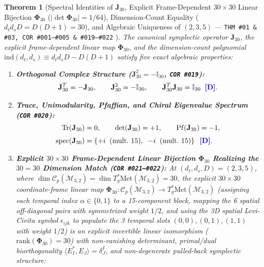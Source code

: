 \documentclass[11pt,a4paper]{article}
\newcommand{\catD}{\text{\textbf{\textcolor{blue!75!black}{[D]}}}}
\theoremstyle{definition}
\theoremstyle{plain}
\newtheorem{theorem}[axiom]{Theorem}
\theoremstyle{remark}
\begin{document}
\begin{theorem}[Spectral Identities of $\mathbf{J}_{30}$, Explicit Frame-Dependent $30\times 30$ Linear Bijection $\bm{\Phi}_{30}$ ($|\det\bm{\Phi}_{30}| = 1/64$), Dimension-Count Equality ($d_t d_s D = D(D+1) = 30$), and Algebraic Uniqueness of $(2,3,5)$ --- \texttt{THM~\#01 \& \#03, COR~\#001--\#005 \& \#019--\#022} \catD]\label{thm:c1_j30_diophantine}\label{thm:c1_symplectic_uniqueness}
The canonical symplectic operator $\mathbf{J}_{30}$, the explicit frame-dependent linear map $\bm{\Phi}_{30}$, and the dimension-count polynomial $\mathrm{ind}(d_t, d_s) \equiv d_t d_s D - D(D+1)$ satisfy five exact algebraic properties:
\begin{enumerate}[label=(\roman*)]
  \item \textbf{Orthogonal Complex Structure ($\mathbf{J}_{30}^2 = -\mathbb{I}_{30}$, \texttt{COR~\#019}):}
  \begin{equation}\label{eq:c1_j30_complex}
  \mathbf{J}_{30}^T = -\mathbf{J}_{30}, \qquad
  \mathbf{J}_{30}^2 = -\mathbb{I}_{30}, \qquad
  \mathbf{J}_{30}^T\mathbf{J}_{30} = \mathbb{I}_{30} \;\;\catD.
  \end{equation}
  \item \textbf{Trace, Unimodularity, Pfaffian, and Chiral Eigenvalue Spectrum (\texttt{COR~\#020}):}
  \begin{align}
  \mathrm{Tr}\!\left(\mathbf{J}_{30}\right) &= 0, \qquad
  \det\!\left(\mathbf{J}_{30}\right) = +1, \qquad
  \mathrm{Pf}\!\left(\mathbf{J}_{30}\right) = -1, \nonumber \\[3pt]
  \mathrm{spec}\!\left(\mathbf{J}_{30}\right) &= \left\{ +i \;\; (\textnormal{mult.\ } 15), \;\; -i \;\; (\textnormal{mult.\ } 15) \right\} \;\;\catD. \label{eq:c1_j30_spectrum}
  \end{align}
  \item \textbf{Explicit $30\times 30$ Frame-Dependent Linear Bijection $\bm{\Phi}_{30}$ Realizing the $30 = 30$ Dimension Match (\texttt{COR~\#021--\#022}):}
  At $(d_t, d_s, D) = (2, 3, 5)$, where $\dim\mathcal{C}_p(\mathcal{M}_{3,2}) = \dim T^*_g\mathrm{Met}(\mathcal{M}_{3,2}) = 30$, the explicit $30\times 30$ coordinate-frame linear map $\bm{\Phi}_{30}: \mathcal{C}_p(\mathcal{M}_{3,2}) \to T^*_g\mathrm{Met}(\mathcal{M}_{3,2})$ (assigning each temporal index $\alpha \in \{0,1\}$ to a 15-component block, mapping the 6 spatial off-diagonal pairs with symmetrized weight $1/2$, and using the 3D spatial Levi-Civita symbol $\epsilon_{ijk}$ to populate the 3 temporal slots $(0,0),(0,1),(1,1)$ with weight $1/2$) is an explicit invertible linear isomorphism ($\mathrm{rank}(\bm{\Phi}_{30}) = 30$) with non-vanishing determinant, primal/dual biorthogonality $\langle E^*_I, E_J\rangle = \delta^I_J$, and non-degenerate pulled-back symplectic structure:

\end{enumerate}
\end{theorem}
\end{document}
